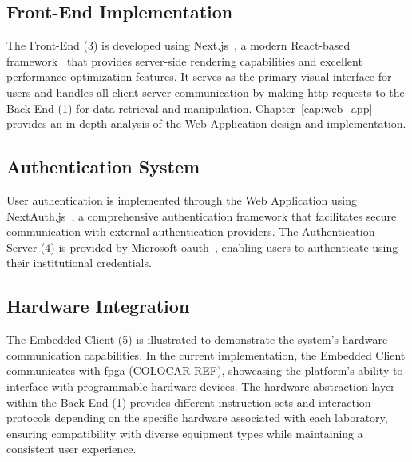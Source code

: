 \subsection*{Front-End Implementation}
The Front-End (3) is developed using Next.js~\cite{nextjs-docs}, a modern React-based framework~\cite{react} that provides server-side rendering capabilities and excellent performance optimization features. It serves as the primary visual interface for users and handles all client-server communication by making \acs{http} requests to the Back-End (1) for data retrieval and manipulation. Chapter~\ref{cap:web_app} provides an in-depth analysis of the Web Application design and implementation.

\subsection*{Authentication System}
User authentication is implemented through the Web Application using NextAuth.js~\cite{nextjs-authentication}, a comprehensive authentication framework that facilitates secure communication with external authentication providers. The Authentication Server (4) is provided by Microsoft \ac{oauth}~\cite{microsoft-oauth}, enabling users to authenticate using their institutional credentials.

\subsection*{Hardware Integration}
The Embedded Client (5) is illustrated to demonstrate the system's hardware communication capabilities. In the current implementation, the Embedded Client communicates with \ac{fpga} (COLOCAR REF), showcasing the platform's ability to interface with programmable hardware devices. The hardware abstraction layer within the Back-End (1) provides different instruction sets and interaction protocols depending on the specific hardware associated with each laboratory, ensuring compatibility with diverse equipment types while maintaining a consistent user experience.
